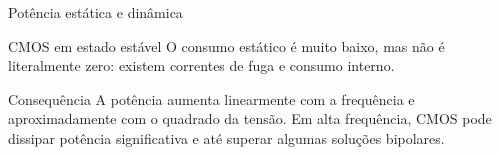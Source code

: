 \begin{frame}{Potência estática e dinâmica}
    \begin{block}{CMOS em estado estável}
        O consumo estático é muito baixo, mas não é literalmente zero: existem
        correntes de fuga e consumo interno.
    \end{block}

    \begin{alertblock}{Consequência}
        A potência aumenta linearmente com a frequência e aproximadamente com o
        quadrado da tensão. Em alta frequência, CMOS pode dissipar potência
        significativa e até superar algumas soluções bipolares.
    \end{alertblock}
\end{frame}